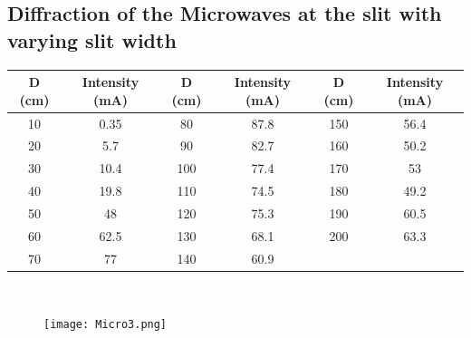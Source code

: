 \documentclass[12pt]{report}
\begin{document}
\subsection{Diffraction of the Microwaves at the slit with varying slit width}
\begin{center}
	\begin{tabular}{ |c|c|c|c|c|c| } 
		\hline
		D (cm) & Intensity (mA) & D (cm) & Intensity (mA) & D (cm) & Intensity (mA)\\ 
		\hline
		10 & 0.35 & 80  & 87.8 & 150 & 56.4 \\
		20 & 5.7  & 90  & 82.7 & 160 & 50.2 \\
		30 & 10.4 & 100 & 77.4 & 170 & 53   \\
		40 & 19.8 & 110 & 74.5 & 180 & 49.2 \\
		50 & 48   & 120 & 75.3 & 190 & 60.5 \\
		60 & 62.5 & 130 & 68.1 & 200 & 63.3 \\
		70 & 77   & 140 & 60.9 &     &      \\
		\hline
	\end{tabular}
	\\
\end{center}

\begin{figure}[h]
	\centering
	\texttt{[image: Micro3.png]}
\end{figure}


\newpage
\end{document}

